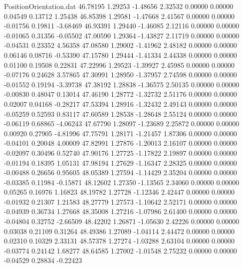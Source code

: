 \begin{filecontents}{PositionOrientation.dat}
  46.78195    1.29253   -1.48656     2.32532    0.00000    0.00000    0.04549    0.13712    1.25438
  46.85398    1.29581   -1.47668     2.41567    0.00000    0.00000   -0.01756    0.19811   -3.68469
  46.93391    1.29440   -1.46085     2.12116    0.00000    0.00000   -0.01065    0.31356   -0.05502
  47.00590    1.29364   -1.43827     2.11719    0.00000    0.00000   -0.04531    0.23352    4.56358
  47.08580    1.29002   -1.41962     2.48182    0.00000    0.00000    0.06146    0.08716   -0.53390
  47.15780    1.29444   -1.41334     2.44338    0.00000    0.00000    0.01100    0.19508    0.22831
  47.22996    1.29523   -1.39927     2.45985    0.00000    0.00000   -0.07176    0.24628    3.57865
  47.30991    1.28950   -1.37957     2.74598    0.00000    0.00000   -0.01552    0.19194   -3.39738
  47.38192    1.28838   -1.36575     2.50135    0.00000    0.00000   -0.00830    0.48047    0.13014
  47.46190    1.28772   -1.32732     2.51176    0.00000    0.00000    0.02007    0.04168   -0.28217
  47.53394    1.28916   -1.32432     2.49143    0.00000    0.00000   -0.05259    0.52593    0.83117
  47.60589    1.28538   -1.28648     2.55124    0.00000    0.00000   -0.06119    0.68865   -4.06243
  47.67790    1.28097   -1.23689     2.25872    0.00000    0.00000    0.00920    0.27905   -4.81996
  47.75791    1.28171   -1.21457     1.87306    0.00000    0.00000   -0.04101    0.20048    4.00009
  47.82991    1.27876   -1.20013     2.16107    0.00000    0.00000   -0.02097    0.30496    0.52740
  47.90176    1.27725   -1.17822     2.19897    0.00000    0.00000   -0.01194    0.18395    1.05131
  47.98194    1.27629   -1.16347     2.28325    0.00000    0.00000   -0.00488    0.26656    0.95605
  48.05389    1.27594   -1.14429     2.35204    0.00000    0.00000   -0.03385    0.11984   -0.15871
  48.12602    1.27350   -1.13565     2.34060    0.00000    0.00000    0.05265    0.16976    1.16823
  48.19782    1.27728   -1.12346     2.42447    0.00000    0.00000   -0.01932    0.21307    1.21583
  48.27779    1.27573   -1.10642     2.52171    0.00000    0.00000   -0.04939    0.36734    1.27668
  48.35008    1.27216   -1.07986     2.61400    0.00000    0.00000   -0.04804    0.32752   -2.66509
  48.42202    1.26871   -1.05630     2.42226    0.00000    0.00000    0.03038    0.21109    0.31264
  48.49386    1.27089   -1.04114     2.44472    0.00000    0.00000    0.02310    0.10329    2.33131
  48.57378    1.27274   -1.03288     2.63104    0.00000    0.00000   -0.03774    0.24142    1.68277
  48.64585    1.27002   -1.01548     2.75232    0.00000    0.00000   -0.04529    0.28834   -0.22423

\end{filecontents}
